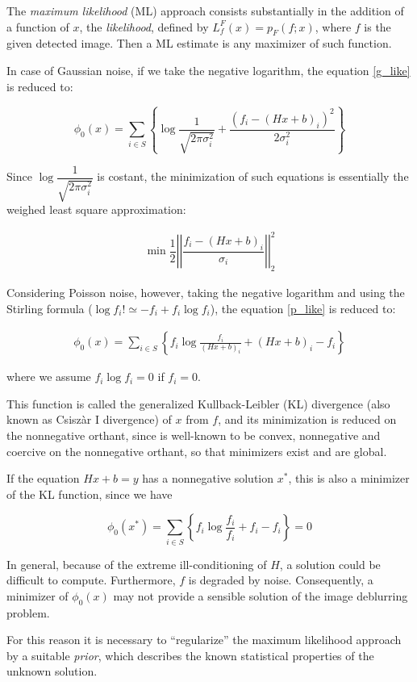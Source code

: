 The \emph{maximum likelihood} (ML) approach consists substantially in the addition of a function of $x$, the \emph{likelihood}, defined by $L_f^F(x) = p_F(f;x)$, where $f$ is the given detected image. Then a ML estimate is any maximizer of such function.

In case of Gaussian noise, if we take the negative logarithm, the equation \eqref{g_like} is reduced to:

$$\phi_0(x) = \sum_{i \in S} \left\{ \log{\dfrac{1}{\sqrt{2\pi\sigma_i^2}}}+\dfrac{(f_i-(Hx+b)_i)^2}{2\sigma_i^2} \right\}$$

Since $\log{\dfrac{1}{\sqrt{2\pi\sigma_i^2}}}$ is costant, the minimization of such equations is essentially the weighed least square approximation:

\begin{align}
\label{weigh_lsq}
\min \dfrac{1}{2} \left| \left| \dfrac{f_i-(Hx+b)_i}{\sigma_i}\right| \right|_2^2
\end{align}

Considering Poisson noise, however, taking the negative logarithm and using the Stirling formula ($\log f_i! \simeq -f_i + f_i \log f_i$), the equation \eqref{p_like} is reduced to:

\begin{align}
\label{KL}
\phi_0(x) = \sum_{i \in S} \left\{f_i \log{\frac{f_i}{(Hx+b)_i}}+(Hx+b)_i - f_i\right\}
\end{align}

where we assume $f_i \log f_i =0$ if $f_i =0$.

This function is called the generalized  Kullback-Leibler (KL) divergence (also known as Csisz\`{a}r I divergence) of $x$ from $f$, and its minimization is reduced on the nonnegative orthant, since is well-known to be convex, nonnegative and coercive on the nonnegative orthant, so that minimizers exist and are global.

If the equation $Hx+b = y$ has a nonnegative solution $x^*$, this is also a minimizer of the KL function, since we have

$$\phi_0(x^*) = \sum_{i \in S} \left\{ f_i \log{\dfrac{f_i}{f_i}} + f_i - f_i \right\} = 0$$

In general, because of the extreme ill-conditioning of $H$, a solution could be difficult to compute. Furthermore, $f$ is degraded by noise. Consequently, a minimizer of $\phi_0(x)$ may not provide a sensible solution of the image deblurring problem.

For this reason it is necessary to ``regularize'' the maximum likelihood approach by a suitable \emph{prior}, which describes the known statistical properties of the unknown solution.

